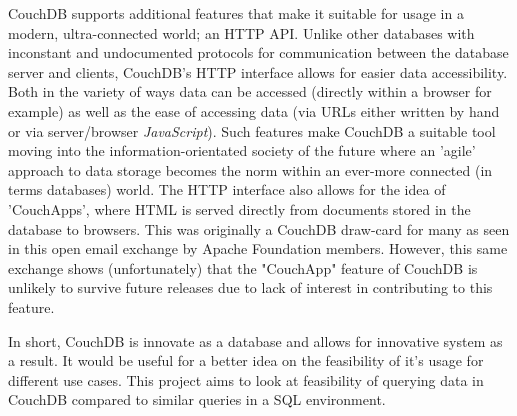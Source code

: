 CouchDB supports additional features that make it suitable for usage in a modern, ultra-connected world; an HTTP API. Unlike other databases with inconstant and undocumented protocols for communication between the database server and clients, CouchDB's HTTP interface allows for easier data accessibility. Both in the variety of ways data can be accessed (directly within a browser for example) as well as the ease of accessing data (via URLs either written by hand or via server/browser \textit{JavaScript}). Such features make CouchDB a suitable tool moving into the information-orientated society of the future where an 'agile' approach to data storage becomes the norm within an ever-more connected (in terms databases) world. The HTTP interface also allows for the idea of 'CouchApps', where HTML is served directly from documents stored in the database to browsers. This was originally a CouchDB draw-card for many as seen in this open email exchange \cite{googleCon2017} by Apache Foundation members. However, this same exchange shows (unfortunately) that the "CouchApp" feature of CouchDB is unlikely to survive future releases due to lack of interest in contributing to this feature.

In short, CouchDB is innovate as a database and allows for innovative system as a result. It would be useful for a better idea on the feasibility of it's usage for different use cases. This project aims to look at feasibility of querying data in CouchDB compared to similar queries in a SQL environment.
